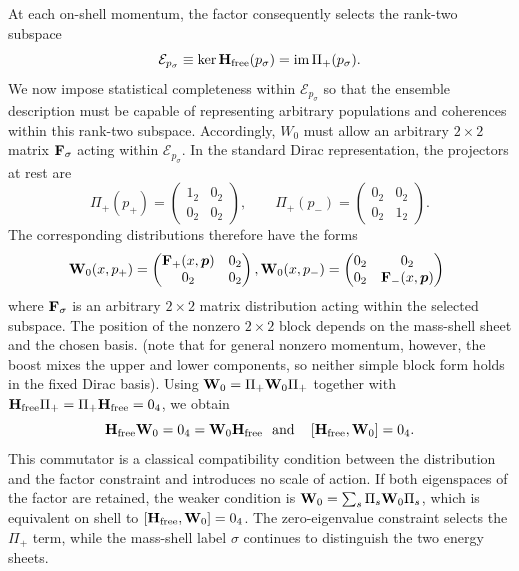\documentclass[final,5p,times,twocolumn]{elsarticle}
\begin{document}
At each on-shell momentum, the factor consequently selects the rank-two subspace
\begin{equation}
    \mathcal{E}_{p_\sigma}
    \equiv
    \ker \mathbf{H}_{\mathrm{free}}(p_\sigma)
    =
    \operatorname{im}\Pi_+(p_\sigma).
    \label{eq:constraint-subspace}
\end{equation}
We now impose statistical completeness within $\mathcal{E}_{p_\sigma}$ so that the ensemble description must be capable of representing arbitrary populations and coherences within this rank-two subspace.
Accordingly, $W_0$ must allow an arbitrary $2\times2$ matrix $\mathbf{F}_\sigma$ acting within $\mathcal{E}_{p_\sigma}$.
In the standard Dirac representation, the projectors at rest are
\begin{equation}
    \Pi_+(p_+)
    =
    \begin{pmatrix}
        1_2 & 0_2\\
        0_2 & 0_2
    \end{pmatrix},
    \qquad
    \Pi_+(p_-)
    =
    \begin{pmatrix}
        0_2 & 0_2\\
        0_2 & 1_2
    \end{pmatrix}.
\end{equation}
The corresponding distributions therefore have the forms
\begin{equation}
  \hspace{-4pt}  
  \mathbf{W}_0(x,p_+)
    =
    \begin{pmatrix}
        \mathbf{F}_+(x,\bm p) & 0_2\\
        0_2 & 0_2
    \end{pmatrix},
    \mathbf{W}_0(x,p_-)
    =
    \begin{pmatrix}
        0_2 & 0_2\\
        0_2 & \mathbf{F}_-(x,\bm p)
    \end{pmatrix}
    \label{eq:projected-classical-ansatz}
\end{equation}
where $\mathbf{F}_\sigma$ is an arbitrary $2\times2$ matrix distribution acting within the selected subspace.
The position of the nonzero $2\times2$ block depends on the mass-shell sheet and the chosen basis. (note that for general nonzero momentum, however, the boost mixes the upper and lower components, so neither simple block form holds in the fixed Dirac basis).
Using $\mathbf{W}_0=\Pi_{+}\mathbf{W}_0\Pi_{+}$ together with $\mathbf{H}_{\mathrm{free}}\Pi_{+} =\Pi_{+}\mathbf{H}_{\mathrm{free}}=0_4$, we obtain
\begin{equation}
    \mathbf{H}_{\mathrm{free}}\mathbf{W}_0
    =0_4
    =\mathbf{W}_0\mathbf{H}_{\mathrm{free}} \text{\ \  and \ \  }
    \left[{\mathbf{H}_{\mathrm{free}}} ,{\mathbf{W}_0}\right]=0_4.
    \label{eq:classical-commutator-constraint}
\end{equation}
This commutator is a classical compatibility condition between the distribution and the factor constraint and introduces no scale of action. If both eigenspaces of the factor are retained, the weaker condition is $\mathbf{W}_0=\sum_s\Pi_s\mathbf{W}_0\Pi_s$, which is equivalent on shell to $\left[{\mathbf{H}_{\mathrm{free}}} ,{\mathbf{W}_0}\right]=0_4$. The zero-eigenvalue constraint selects the $\Pi_+$ term, while the mass-shell label $\sigma$ continues to distinguish the two energy sheets.
\end{document}
